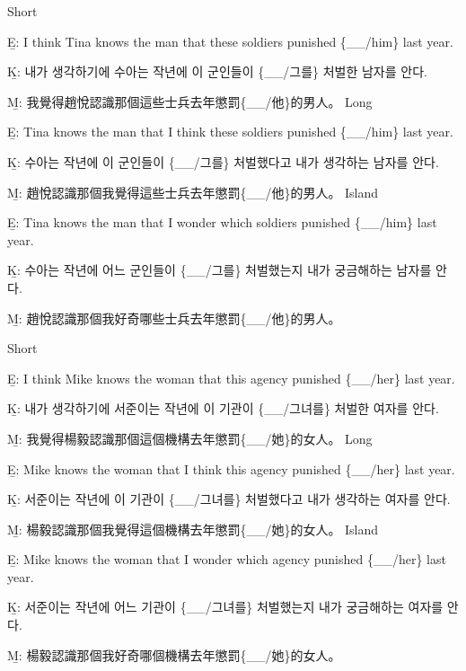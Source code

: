 \pex %
\a Short\par\nobreak
\beginsubsub
\b{E:} I think Tina knows the man that these soldiers punished \{\_\_/him\} last year.\par\nobreak
\b{K:} \ko 내가 생각하기에 수아는 작년에 이 군인들이 \{\_\_/그를\} 처벌한 남자를 안다. \normalfont\par\nobreak
\b{M:} \zh 我覺得趙悅認識那個這些士兵去年懲罰\{\_\_/他\}的男人。 \normalfont
\endsubsub
\a Long\par\nobreak
\beginsubsub
\b{E:} Tina knows the man that I think these soldiers punished \{\_\_/him\} last year.\par\nobreak
\b{K:} \ko 수아는 작년에 이 군인들이 \{\_\_/그를\} 처벌했다고 내가 생각하는 남자를 안다. \normalfont\par\nobreak
\b{M:} \zh 趙悅認識那個我覺得這些士兵去年懲罰\{\_\_/他\}的男人。 \normalfont
\endsubsub
\a Island\par\nobreak
\beginsubsub
\b{E:} Tina knows the man that I wonder which soldiers punished \{\_\_/him\} last year.\par\nobreak
\b{K:} \ko 수아는 작년에 어느 군인들이 \{\_\_/그를\} 처벌했는지 내가 궁금해하는 남자를 안다\normalfont.\par\nobreak
\b{M:} \zh 趙悅認識那個我好奇哪些士兵去年懲罰\{\_\_/他\}的男人。\normalfont
\endsubsub
\xe

\pex %
\a Short\par\nobreak
\beginsubsub
\b{E:} I think Mike knows the woman that this agency punished \{\_\_/her\} last year.\par\nobreak
\b{K:} \ko 내가 생각하기에 서준이는 작년에 이 기관이 \{\_\_/그녀를\} 처벌한 여자를 안다. \normalfont\par\nobreak
\b{M:} \zh 我覺得楊毅認識那個這個機構去年懲罰\{\_\_/她\}的女人。 \normalfont
\endsubsub
\a Long\par\nobreak
\beginsubsub
\b{E:} Mike knows the woman that I think this agency punished \{\_\_/her\} last year.\par\nobreak
\b{K:} \ko 서준이는 작년에 이 기관이 \{\_\_/그녀를\} 처벌했다고 내가 생각하는 여자를 안다. \normalfont\par\nobreak
\b{M:} \zh 楊毅認識那個我覺得這個機構去年懲罰\{\_\_/她\}的女人。 \normalfont
\endsubsub
\a Island\par\nobreak
\beginsubsub
\b{E:} Mike knows the woman that I wonder which agency punished \{\_\_/her\} last year.\par\nobreak
\b{K:} \ko 서준이는 작년에 어느 기관이 \{\_\_/그녀를\} 처벌했는지 내가 궁금해하는 여자를 안다\normalfont.\par\nobreak
\b{M:} \zh 楊毅認識那個我好奇哪個機構去年懲罰\{\_\_/她\}的女人。\normalfont
\endsubsub
\xe


